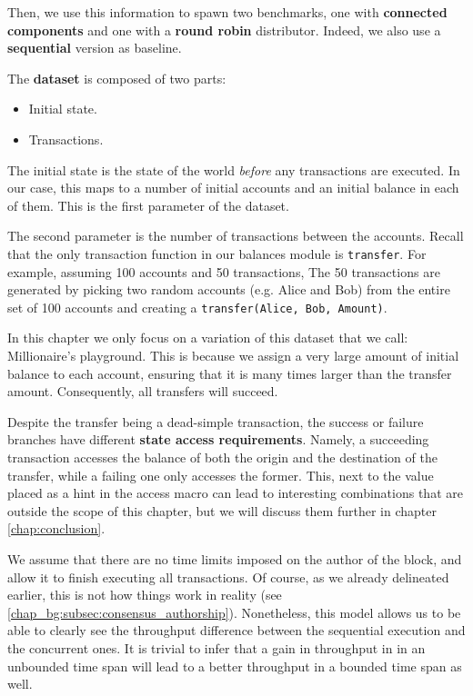 Then, we use this information to spawn two benchmarks, one with \textbf{connected components} and
one with a \textbf{round robin} distributor. Indeed, we also use a \textbf{sequential} version as
baseline.

The \textbf{dataset} is composed of two parts:

\begin{itemize}
	\item Initial state.
	\item Transactions.
\end{itemize}

The initial state is the state of the world \textit{before} any transactions are executed. In our
case, this maps to a number of initial accounts and an initial balance in each of them. This is the
first parameter of the dataset.

The second parameter is the number of transactions between the accounts. Recall that the only
transaction function in our balances module is \texttt{transfer}. For example, assuming 100 accounts
and 50 transactions, The 50 transactions are generated by picking two random accounts (e.g. Alice
and Bob) from the entire set of 100 accounts and creating a \texttt{transfer(Alice, Bob, Amount)}.

In this chapter we only focus on a variation of this dataset that we call: Millionaire's playground.
This is because we assign a very large amount of initial balance to each account, ensuring that it
is many times larger than the transfer amount. Consequently, all transfers will succeed.

\begin{remark}
	Despite the transfer being a dead-simple transaction, the success or failure branches have
	different \textbf{state access requirements}. Namely, a succeeding transaction accesses the
	balance of both the origin and the destination of the transfer, while a failing one only
	accesses the former. This, next to the value placed as a hint in the access macro can lead to
	interesting combinations that are outside the scope of this chapter, but we will discuss them
	further in chapter \ref{chap:conclusion}.
\end{remark}

We assume that there are no time limits imposed on the author of the block, and allow it to finish
executing all transactions. Of course, as we already delineated earlier, this is not how things work
in reality (see \ref{chap_bg:subsec:consensus_authorship}). Nonetheless, this model allows us to be
able to clearly see the throughput difference between the sequential execution and the concurrent
ones. It is trivial to infer that a gain in throughput in in an unbounded time span will lead to a
better throughput in a bounded time span as well.

